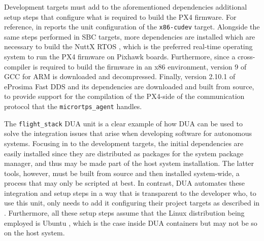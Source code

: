 Development targets must add to the aforementioned dependencies additional setup steps that configure what is required to build the PX4 firmware. For reference,  in  reports the unit configuration of the \texttt{x86-cudev} target. Alongside the same steps performed in SBC targets, more dependencies are installed which are necessary to build the NuttX RTOS \cite{apache_software_foundation_apache_nodate}, which is the preferred real-time operating system to run the PX4 firmware on Pixhawk boards. Furthermore, since a cross-compiler is required to build the firmware in an x86 environment, version 9 of GCC \cite{free_software_foundation_gcc_nodate} for ARM is downloaded and decompressed. Finally, version 2.10.1 of eProsima Fast DDS and its dependencies are downloaded and built from source, to provide support for the compilation of the PX4-side of the communication protocol that the \texttt{micrortps\_agent} handles.

The \texttt{flight\_stack} DUA unit is a clear example of how DUA can be used to solve the integration issues that arise when developing software for autonomous systems. Focusing in to the development targets, the initial dependencies are easily installed since they are distributed as packages for the system package manager, and thus may be made part of the host system installation. The latter tools, however, must be built from source and then installed system-wide, a process that may only be scripted at best. In contrast, DUA automates these integration and setup steps in a way that is transparent to the developer who, to use this unit, only needs to add it configuring their project targets as described in . Furthermore, all these setup steps assume that the Linux distribution being employed is Ubuntu \cite{canonical_ubuntu_nodate}, which is the case inside DUA containers but may not be so on the host system.

